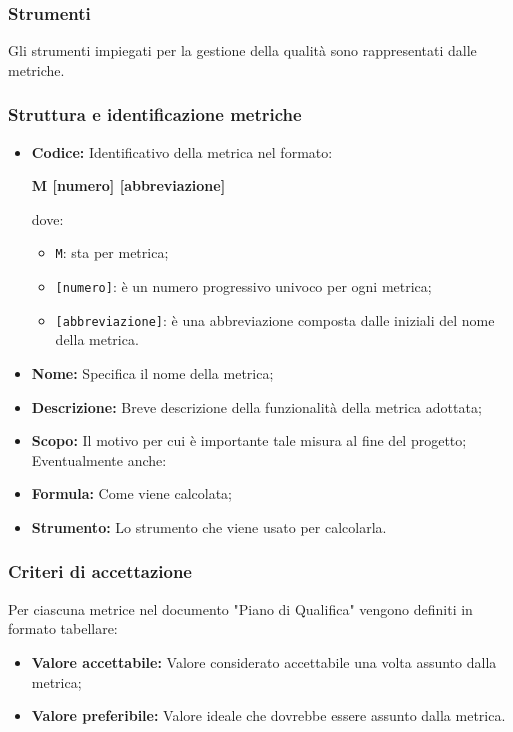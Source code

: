 \subsubsection{Strumenti}
Gli strumenti impiegati per la gestione della qualità sono rappresentati dalle metriche.

\subsubsection{Struttura e identificazione metriche}
\begin{itemize}
    \item \textbf{Codice:} Identificativo della metrica nel formato:
          \begin{center}
              \textbf{M [numero] [abbreviazione]}
          \end{center}
          dove:
          \begin{itemize}
              \item \texttt{M}: sta per metrica;
              \item \texttt{[numero]}: è un numero progressivo univoco per ogni metrica;
              \item \texttt{[abbreviazione]}: è una abbreviazione composta dalle iniziali del nome della metrica.
          \end{itemize}
    \item \textbf{Nome:} Specifica il nome della metrica;
    \item \textbf{Descrizione:} Breve descrizione della funzionalità della metrica adottata;
    \item \textbf{Scopo:} Il motivo per cui è importante tale misura al fine del progetto;
          Eventualmente anche:
    \item \textbf{Formula:} Come viene calcolata;
    \item \textbf{Strumento:} Lo strumento che viene usato per calcolarla.
\end{itemize}

\subsubsection{Criteri di accettazione}
Per ciascuna metrice nel documento "Piano di Qualifica" vengono definiti in formato tabellare:
\begin{itemize}
    \item \textbf{Valore accettabile:} Valore considerato accettabile una volta assunto dalla metrica;
    \item \textbf{Valore preferibile:} Valore ideale che dovrebbe essere assunto dalla metrica.
\end{itemize}

